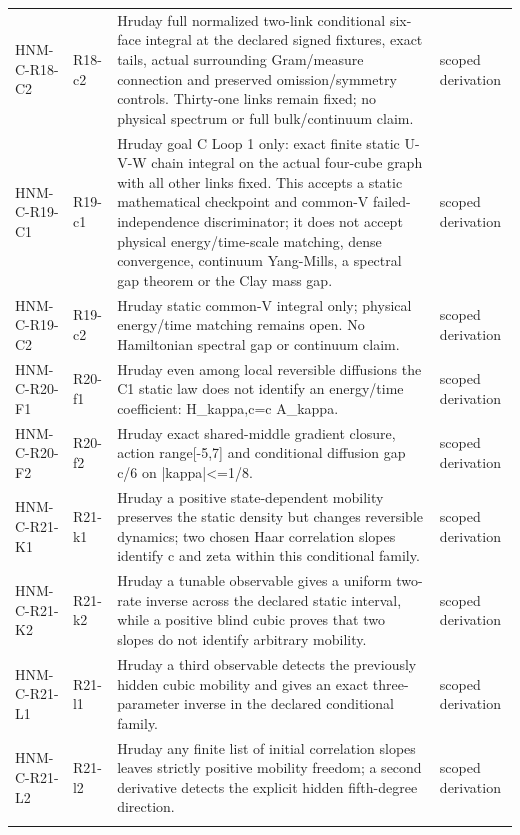 \begin{longtable}{@{}p{30mm}p{26mm}p{65mm}p{27mm}@{}}
HNM-C-R18-C2 & R18-c2 & Hruday full normalized two-link conditional six-face integral at the declared signed fixtures, exact tails, actual surrounding Gram/measure connection and preserved omission/symmetry controls. Thirty-one links remain fixed; no physical spectrum or full bulk/continuum claim. & scoped derivation\\\addlinespace
HNM-C-R19-C1 & R19-c1 & Hruday goal C Loop 1 only: exact finite static U-V-W chain integral on the actual four-cube graph with all other links fixed. This accepts a static mathematical checkpoint and common-V failed-independence discriminator; it does not accept physical energy/time-scale matching, dense convergence, continuum Yang-Mills, a spectral gap theorem or the Clay mass gap. & scoped derivation\\\addlinespace
HNM-C-R19-C2 & R19-c2 & Hruday static common-V integral only; physical energy/time matching remains open. No Hamiltonian spectral gap or continuum claim. & scoped derivation\\\addlinespace
HNM-C-R20-F1 & R20-f1 & Hruday even among local reversible diffusions the C1 static law does not identify an energy/time coefficient: H\_kappa,c=c A\_kappa. & scoped derivation\\\addlinespace
HNM-C-R20-F2 & R20-f2 & Hruday exact shared-middle gradient closure, action range[-5,7] and conditional diffusion gap c/6 on |kappa|<=1/8. & scoped derivation\\\addlinespace
HNM-C-R21-K1 & R21-k1 & Hruday a positive state-dependent mobility preserves the static density but changes reversible dynamics; two chosen Haar correlation slopes identify c and zeta within this conditional family. & scoped derivation\\\addlinespace
HNM-C-R21-K2 & R21-k2 & Hruday a tunable observable gives a uniform two-rate inverse across the declared static interval, while a positive blind cubic proves that two slopes do not identify arbitrary mobility. & scoped derivation\\\addlinespace
HNM-C-R21-L1 & R21-l1 & Hruday a third observable detects the previously hidden cubic mobility and gives an exact three-parameter inverse in the declared conditional family. & scoped derivation\\\addlinespace
HNM-C-R21-L2 & R21-l2 & Hruday any finite list of initial correlation slopes leaves strictly positive mobility freedom; a second derivative detects the explicit hidden fifth-degree direction. & scoped derivation\\\addlinespace

\end{longtable}
